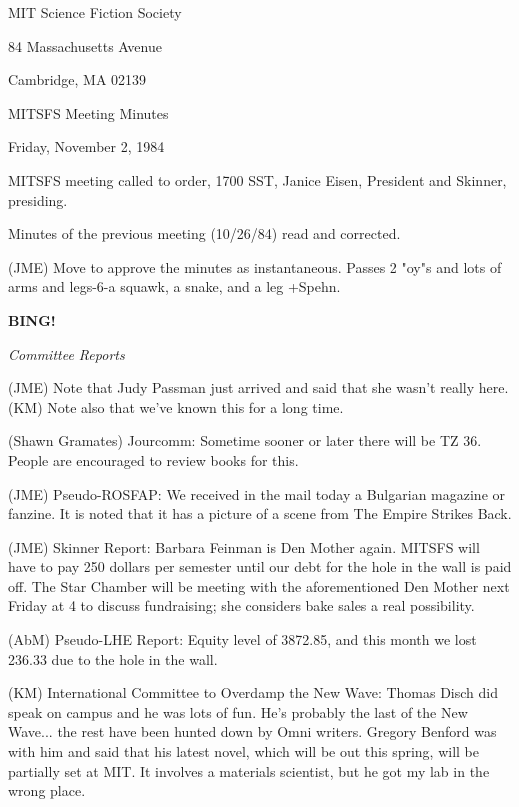\documentclass[12pt]{article}
\newcommand{\bing}{{\bf BING!} }
\newcommand{\goto}[1]{\bing \vskip 12pt \centerline{{\em{#1}}}}
\begin{document}
\begin{center}

MIT Science Fiction Society 

84 Massachusetts Avenue

Cambridge, MA 02139

\vspace{12pt}

MITSFS Meeting Minutes 

Friday, November 2, 1984

\end{center}
 
\vspace{18pt}

\setlength{\parskip}{6pt}

\noindent
MITSFS meeting called to order, 1700 SST,
Janice Eisen, President and Skinner, presiding.

Minutes of the previous meeting (10/26/84) read and corrected.

(JME) Move to approve the minutes as instantaneous. Passes 2 "oy"s and lots of arms and legs-6-a squawk, a snake, and a leg +Spehn.

\goto{Committee Reports}

(JME) Note that Judy Passman just arrived and said that she wasn't really here. (KM) Note also that we've known this for a long time.

(Shawn Gramates) Jourcomm: Sometime sooner or later there will be TZ 36. People are encouraged to review books for this.

(JME) Pseudo-ROSFAP: We received in the mail today a Bulgarian magazine or fanzine. It is noted that it has a picture of a scene from The Empire Strikes Back.

(JME) Skinner Report: Barbara Feinman is Den Mother       again. MITSFS will have to pay 250 dollars per semester until our debt for the hole in the wall is paid off. The Star Chamber will be meeting with the aforementioned Den Mother       next Friday at 4 to discuss fundraising; she considers bake sales a real possibility.

(AbM) Pseudo-LHE Report: Equity level of 3872.85, and this month we lost 236.33 due to the hole in the wall.

(KM) International Committee to Overdamp the New Wave: Thomas Disch did speak on campus and he was lots of fun. He's probably the last of the New Wave... the rest have been hunted down by Omni writers. Gregory Benford was with him and said that his latest novel, which will be out this spring, will be partially set at MIT. It involves a materials scientist, but he got my lab in the wrong place.
\end{document}
